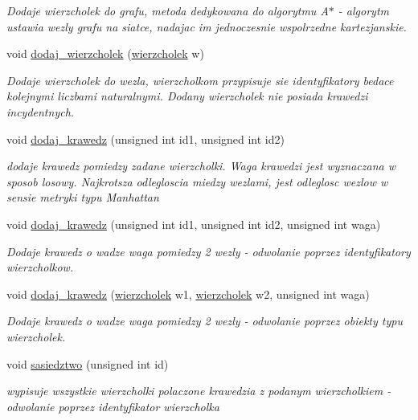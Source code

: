 \begin{DoxyCompactItemize}
\begin{DoxyCompactList}\small\item\em Dodaje wierzcholek do grafu, metoda dedykowana do algorytmu A$\ast$ -\/ algorytm ustawia wezly grafu na siatce, nadajac im jednoczesnie wspolrzedne kartezjanskie. \end{DoxyCompactList}\item 
void \hyperlink{classgraf_abe2f98850133e73015ab8232d90d7530}{dodaj\-\_\-wierzcholek} (\hyperlink{classwierzcholek}{wierzcholek} w)
\begin{DoxyCompactList}\small\item\em Dodaje wierzcholek do wezla, wierzcholkom przypisuje sie identyfikatory bedace kolejnymi liczbami naturalnymi. Dodany wierzcholek nie posiada krawedzi incydentnych. \end{DoxyCompactList}\item 
void \hyperlink{classgraf_a1f26f02561438e7c5210a9aa31cc1566}{dodaj\-\_\-krawedz} (unsigned int id1, unsigned int id2)
\begin{DoxyCompactList}\small\item\em dodaje krawedz pomiedzy zadane wierzcholki. Waga krawedzi jest wyznaczana w sposob losowy. Najkrotsza odlegloscia miedzy wezlami, jest odleglosc wezlow w sensie metryki typu Manhattan \end{DoxyCompactList}\item 
void \hyperlink{classgraf_af263156c2af2d8d2ec0d7ff0ee3dd9af}{dodaj\-\_\-krawedz} (unsigned int id1, unsigned int id2, unsigned int waga)
\begin{DoxyCompactList}\small\item\em Dodaje krawedz o wadze waga pomiedzy 2 wezly -\/ odwolanie poprzez identyfikatory wierzcholkow. \end{DoxyCompactList}\item 
void \hyperlink{classgraf_a8442b7d095a21024666b12c3e3f4184b}{dodaj\-\_\-krawedz} (\hyperlink{classwierzcholek}{wierzcholek} w1, \hyperlink{classwierzcholek}{wierzcholek} w2, unsigned int waga)
\begin{DoxyCompactList}\small\item\em Dodaje krawedz o wadze waga pomiedzy 2 wezly -\/ odwolanie poprzez obiekty typu wierzcholek. \end{DoxyCompactList}\item 
void \hyperlink{classgraf_a6a3ee98f332805da9c65749bacad27db}{sasiedztwo} (unsigned int id)
\begin{DoxyCompactList}\small\item\em wypisuje wszystkie wierzcholki polaczone krawedzia z podanym wierzcholkiem -\/ odwolanie poprzez identyfikator wierzcholka \end{DoxyCompactList}\item 

\end{DoxyCompactItemize}
